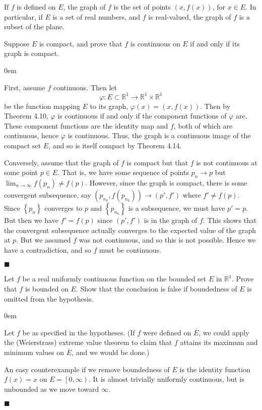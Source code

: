 \documentclass[12pt]{article}
\renewcommand{\qed}{\hfill$\blacksquare$}
\renewenvironment{proof}{\begin{addmargin}[1em]{0em}\begin{newproof}}{\end{newproof}\end{addmargin}\qed}
\newenvironment{problem}[2][Exercise]{\begin{trivlist}
\item[\hskip \labelsep {\bfseries #1}\hskip \labelsep {\bfseries #2.}]}{\end{trivlist}}
\begin{document}
\begin{problem}{4.6}
If $f$ is defined on $E$, the graph of $f$ is the set of points $\left(x,f\left(x\right)\right)$, for $x\in E$. In particular, if $E$ is a set of real numbers, and $f$ is real-valued, the graph of $f$ is a subset of the plane.

Suppose $E$ is compact, and prove that $f$ is continuous on $E$ if and only if its graph is compact.
\end{problem}
\begin{proof}
First, assume $f$ continuous. Then let $$\varphi: E\subset \mathbb{R}^1 \rightarrow \mathbb{R}^1 \times \mathbb{R}^1 $$ be the function mapping $E$ to its graph, $\varphi\left(x\right)=\left(x,f\left(x\right)\right)$. Then by Theorem 4.10, $\varphi$ is continuous if and only if the component functions of $\varphi$ are. These component functions are the identity map and $f$, both of which are continuous, hence $\varphi$ is continuous. Thus, the graph is a continuous image of the compact set $E$, and so is itself compact by Theorem 4.14.

Conversely, assume that the graph of $f$ is compact but that $f$ is not continuous at some point $p\in E$. That is, we have some sequence of points $p_n \rightarrow p$ but $\lim_{n\rightarrow \infty} f\left(p_n\right) \neq f\left(p\right)$. However, since the graph is compact, there is some convergent subsequence, say $\left(p_{n_k}, f\left(p_{n_k}\right)\right)\rightarrow \left(p', f'\right)$ where $f' \neq f\left(p\right)$. Since $\left\{p_n\right\}$ converges to $p$ and $\left\{p_{n_k}\right\}$ is a subsequence, we must have $p'=p$. But then we have $f'=f\left(p\right)$ since $\left(p',f'\right)$ is in the graph of $f$. This shows that the convergent subsequence actually converges to the expected value of the graph at $p$. But we assumed $f$ was not continuous, and so this is not possible. Hence we have a contradiction, and so $f$ must be continuous.
\end{proof}





\begin{problem}{4.8}
	Let $f$ be a real uniformly continuous function on the bounded set $E$ in $\mathbb{R}^1$. Prove that $f$ is bounded on $E$. Show that the conclusion is false if boundedness of $E$ is omitted from the hypothesis.
\end{problem}
\begin{proof}
	Let $f$ be as specified in the hypotheses. (If $f$ were defined on $\overline{E}$, we could apply the (Weierstrass) extreme value theorem to claim that $f$ attains its maximum and minimum values on $\overline{E}$, and we would be done.) 
	
	An easy counterexample if we remove boundedness of $E$ is the identity function $f\left(x\right)=x$ on $E=\left[0,\infty\right)$. It is almost trivially uniformly continuous, but is unbounded as we move toward $\infty$.
\end{proof}













\end{document}
